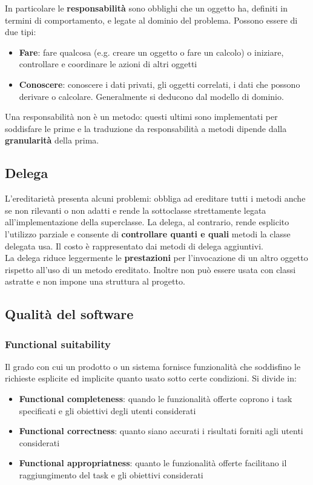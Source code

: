 In particolare le \textbf{responsabilità} sono obblighi che un oggetto ha, definiti in termini di comportamento, e legate al dominio del problema. Possono essere di due tipi:
\begin{itemize}
	\item \textbf{Fare}: fare qualcosa (e.g. creare un oggetto o fare un calcolo) o iniziare, controllare e coordinare le azioni di altri oggetti
	\item \textbf{Conoscere}: conoscere i dati privati, gli oggetti correlati, i dati che possono derivare o calcolare. Generalmente si deducono dal modello di dominio.
\end{itemize}

\begin{observation}
	Una responsabilità non è un metodo: questi ultimi sono implementati per soddisfare le prime e la traduzione da responsabilità a metodi dipende dalla \textbf{granularità} della prima.
\end{observation}

\subsection{Delega}
L'ereditarietà presenta alcuni problemi: obbliga ad ereditare tutti i metodi anche se non rilevanti o non adatti e rende la sottoclasse strettamente legata all'implementazione della superclasse. La delega, al contrario, rende esplicito l'utilizzo parziale e consente di \textbf{controllare quanti e quali} metodi la classe delegata usa. Il costo è rappresentato dai metodi di delega aggiuntivi.\\

La delega riduce leggermente le \textbf{prestazioni} per l'invocazione di un altro oggetto rispetto all'uso di un metodo ereditato. Inoltre non può essere usata con classi astratte e non impone una struttura al progetto.

\subsection{Qualità del software}
\subsubsection{Functional suitability}
Il grado con cui un prodotto o un sistema fornisce funzionalità che soddisfino le richieste esplicite ed implicite quanto usato sotto certe condizioni. Si divide in:
\begin{itemize}
	\item \textbf{Functional completeness}: quando le funzionalità offerte coprono i task specificati e gli obiettivi degli utenti considerati
	\item \textbf{Functional correctness}: quanto siano accurati i risultati forniti agli utenti considerati
	\item \textbf{Functional appropriatness}: quanto le funzionalità offerte facilitano il raggiungimento del task e gli obiettivi considerati
\end{itemize}


